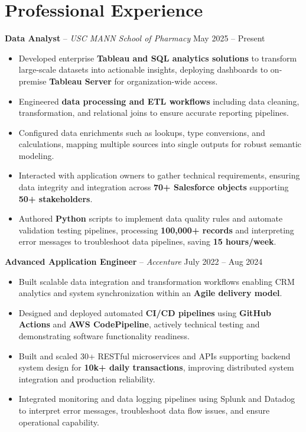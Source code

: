 \documentclass[letterpaper,11pt]{article}
\begin{document}
\section*{Professional Experience}
\textbf{Data Analyst} -- \textit{USC MANN School of Pharmacy} \hfill May 2025 -- Present
\begin{itemize}
\item Developed enterprise \textbf{Tableau and SQL analytics solutions} to transform large-scale datasets into actionable insights, deploying dashboards to on-premise \textbf{Tableau Server} for organization-wide access.
\item Engineered \textbf{data processing and ETL workflows} including data cleaning, transformation, and relational joins to ensure accurate reporting pipelines.
\item Configured data enrichments such as lookups, type conversions, and calculations, mapping multiple sources into single outputs for robust semantic modeling.
\item Interacted with application owners to gather technical requirements, ensuring data integrity and integration across \textbf{70+ Salesforce objects} supporting \textbf{50+ stakeholders}.
\item Authored \textbf{Python} scripts to implement data quality rules and automate validation testing pipelines, processing \textbf{100,000+ records} and interpreting error messages to troubleshoot data pipelines, saving \textbf{15 hours/week}.
\end{itemize}

\textbf{Advanced Application Engineer} -- \textit{Accenture} \hfill July 2022 -- Aug 2024
\begin{itemize}
\item Built scalable data integration and transformation workflows enabling CRM analytics and system synchronization within an \textbf{Agile delivery model}.
\item Designed and deployed automated \textbf{CI/CD pipelines} using \textbf{GitHub Actions} and \textbf{AWS CodePipeline}, actively technical testing and demonstrating software functionality readiness.
\item Built and scaled 30+ RESTful microservices and APIs supporting backend system design for \textbf{10k+ daily transactions}, improving distributed system integration and production reliability.
\item Integrated monitoring and data logging pipelines using Splunk and Datadog to interpret error messages, troubleshoot data flow issues, and ensure operational capability.
\end{itemize}
\end{document}
